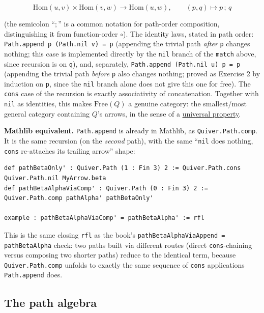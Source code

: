 \[
\mathrm{Hom}(u,v) \times \mathrm{Hom}(v,w) \longrightarrow \mathrm{Hom}(u,w),
\qquad (p, q) \longmapsto p\,;\,q
\]

(the semicolon ``\(;\)'' is a common notation for path-order composition, distinguishing it from function-order \(\circ\)). The identity laws, stated in path order: \texttt{Path.append p (Path.nil v) = p} (appending the trivial path \emph{after} \texttt{p} changes nothing; this case is implemented directly by the \texttt{nil} branch of the \texttt{match} above, since recursion is on \texttt{q}), and, separately, \texttt{Path.append (Path.nil u) p = p} (appending the trivial path \emph{before} \texttt{p} also changes nothing; proved as Exercise 2 by induction on \texttt{p}, since the \texttt{nil} branch alone does not give this one for free). The \texttt{cons} case of the recursion is exactly associativity of concatenation. Together with \texttt{nil} as identities, this makes \(\mathrm{Free}(Q)\) a genuine category: the smallest/most general category containing \(Q\)'s arrows, in the sense of a \hyperref[sec:01-basics:04-terminology:1]{universal property}.

\textbf{Mathlib equivalent.} \texttt{Path.append} is already in Mathlib, as \texttt{Quiver.Path.comp}. It is the same recursion (on the \emph{second} path), with the same ``\texttt{nil} does nothing, \texttt{cons} re-attaches its trailing arrow'' shape:

\begin{lstlisting}
def pathBetaOnly' : Quiver.Path (1 : Fin 3) 2 := Quiver.Path.cons Quiver.Path.nil MyArrow.beta
def pathBetaAlphaViaComp' : Quiver.Path (0 : Fin 3) 2 := Quiver.Path.comp pathAlpha' pathBetaOnly'

example : pathBetaAlphaViaComp' = pathBetaAlpha' := rfl
\end{lstlisting}

This is the same closing \texttt{rfl} as the book's \texttt{pathBetaAlphaViaAppend = pathBetaAlpha} check: two paths built via different routes (direct \texttt{cons}-chaining versus composing two shorter paths) reduce to the identical term, because \texttt{Quiver.Path.comp} unfolds to exactly the same sequence of \texttt{cons} applications \texttt{Path.append} does.

\subsection{The path algebra}\label{sec:11-path-algebras:05-path-composition:3}


